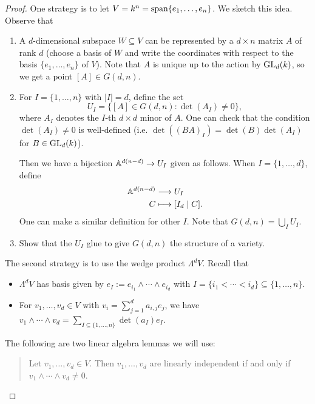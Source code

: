 \begin{proof}
  One strategy is to let
  $V = k^n = \operatorname{span}\{e_1, \dots, e_n\}$.
  We sketch this idea.
  Observe that
  \begin{enumerate}
    \item A $d$-dimensional subspace
      $W \subseteq V$ can be represented by
      a $d \times n$ matrix $A$ of
      rank $d$ (choose a basis of $W$ and
      write the coordinates with respect
      to the basis $\{e_1, \dots, e_n\}$
      of $V$).
      Note that $A$ is unique up to
      the action by
      $\operatorname{GL}_d(k)$, so we get a point
      $[A] \in G(d, n)$.
    \item For $I = \{1, \dots, n\}$ with
      $|I| = d$, define the set
      \[
        U_I = \{
          [A] \in G(d, n)
          : \det(A_I) \ne 0
        \},
      \]
      where $A_I$ denotes the $I$-th
      $d \times d$ minor of $A$.
      One can check that the condition
      $\det(A_I) \ne 0$
      is well-defined
      (i.e. $\det((BA)_I) = \det(B) \det(A_I)$ for $B \in \operatorname{GL}_d(k)$).

    Then we have a bijection
    $\mathbb{A}^{d(n - d)} \to U_I$ given as
    follows. When $I = \{1, \dots, d\}$,
    define
    \begin{align*}
      \mathbb{A}^{d(n - d)} &\longrightarrow U_I \\
      C &\longmapsto
      [ I_d \mid C ].
    \end{align*}
    One can make a similar definition for
    other $I$.
    Note that $G(d, n) = \bigcup_I U_I$.
  \item Show that the $U_I$ glue to give
    $G(d, n)$ the structure of a variety.
  \end{enumerate}
  The second strategy is to use the
  wedge product $\Lambda^d V$.
  Recall that
  \begin{itemize}
    \item $\Lambda^d V$ has basis given
      by $e_I := e_{i_1} \wedge \cdots \wedge e_{i_d}$
      with $I = \{i_1 < \cdots < i_d\} \subseteq \{1, \dots, n\}$.
    \item For $v_1, \dots, v_d \in V$
      with $v_i = \sum_{j = 1}^d a_{i, j} e_j$,
      we have
      $v_1 \wedge \cdots \wedge v_d = \sum_{I \subseteq \{1, \dots, n\}} \det(a_I) e_I$.
  \end{itemize}
  The following are two linear algebra
  lemmas we will use:
  \begin{quote}
    \vspace{-2em}
    \begin{lemma}
      Let $v_1, \dots, v_d \in V$. Then
      $v_1, \dots, v_d$ are linearly independent
      if and only if $v_1 \wedge \cdots \wedge v_d \ne 0$.
    \end{lemma}


\end{quote}
\end{proof}
